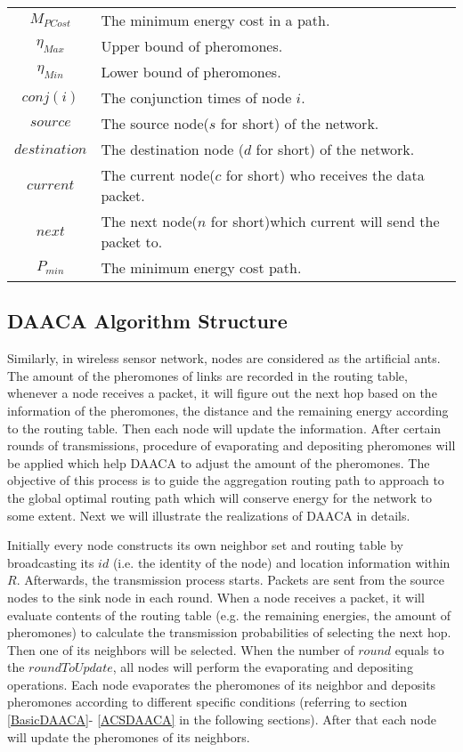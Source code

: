 \documentclass{elsarticle}
\begin{document}
\begin{center}
\begin{longtable}{|c|p{6cm}|}
$M_{PCost}$ & The minimum energy cost in a path. \\
$\eta_{Max}$ & Upper bound of pheromones. \\
$\eta_{Min}$ & Lower bound of pheromones. \\
$conj(i)$ & The conjunction times of node $i$. \\
$source$ & The source node($s$ for short) of the network. \\
$destination$ & The destination node ($d$ for short) of the network. \\
$current$ & The current node($c$ for short) who receives the data packet. \\
$next$ & The next node($n$ for short)which current will send the packet to.\\
$P_{min}$ & The minimum energy cost path. \\
\end{longtable}
\end{center}



\subsection{DAACA Algorithm Structure} \label{DAACAAlgorithmStructure}



Similarly, in wireless sensor network, nodes are considered as the artificial ants. The amount of the pheromones of links are recorded in the routing table, whenever a node receives a packet, it will figure out the next hop based on the information of the pheromones, the distance and the remaining energy according to the routing table. Then each node will update the information. After certain rounds of transmissions, procedure of evaporating and depositing pheromones will be applied which help DAACA to adjust the amount of the pheromones. The objective of this process is to guide the aggregation routing path to approach to the global optimal routing path which will conserve energy for the network to some extent. Next we will illustrate the realizations of DAACA in details.


Initially every node constructs its own neighbor set and routing table by broadcasting its $id$ (i.e. the identity of the node) and location information within $R$. Afterwards, the transmission process starts. Packets are sent from the source nodes to the sink node in each round. When a node receives a packet, it will evaluate contents of the routing table (e.g. the remaining energies, the amount of pheromones) to calculate the transmission probabilities of selecting the next hop. Then one of its neighbors will be selected. When the number of $round$ equals to the $roundToUpdate$, all nodes will perform the evaporating and depositing operations. Each node evaporates the pheromones of its neighbor and deposits pheromones according to different specific conditions (referring to section \ref{BasicDAACA}- \ref{ACSDAACA} in the following sections). After that each node will update the pheromones of its neighbors.
\end{document}
